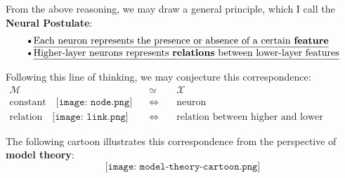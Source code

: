 \documentclass[orivec]{llncs}
\begin{document}
From the above reasoning, we may draw a general principle, which I call the \textbf{Neural Postulate}:
\begin{equation}
\begin{array}{l}
\mbox{\textbullet \underline{Each neuron represents the presence or absence of a certain \textbf{feature}}}\\
\mbox{\textbullet \underline{Higher-layer neurons represents \textbf{relations} between lower-layer features}}
\end{array}
\end{equation}  

Following this line of thinking, we may conjecture this correspondence:
\begin{eqnarray}
\label{conclusion1}
\mathcal{M} & \quad \simeq \quad & \mathcal{X} \nonumber \\
\mbox{constant} \quad \texttt{[image: node.png]} & \quad \Leftrightarrow \quad & \mbox{neuron} \\
\mbox{relation} \quad \texttt{[image: link.png]} & \quad \Leftrightarrow \quad & \mbox{relation between higher and lower neurons} \nonumber
\end{eqnarray}


The following cartoon illustrates this correspondence from the perspective of \textbf{model theory}:
\begin{equation}
\texttt{[image: model-theory-cartoon.png]}
\end{equation}
\end{document}
